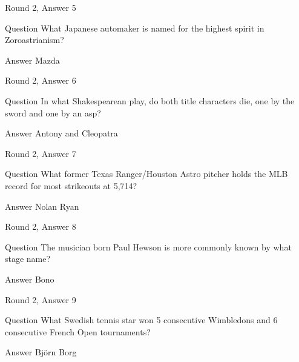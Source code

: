\documentclass[11pt]{beamer}
\begin{document}
\begin{frame}[t]{Round 2, Answer 5}
\vspace{2em}
\begin{block}{Question}
What Japanese automaker is named for the highest spirit in Zoroastrianism\@?
\end{block}
\pause{}
\begin{block}{Answer}
Mazda
\end{block}
\end{frame}
    

\begin{frame}[t]{Round 2, Answer 6}
\vspace{2em}
\begin{block}{Question}
In what Shakespearean play, do both title characters die, one by the sword and one by an asp\@?
\end{block}
\pause{}
\begin{block}{Answer}
Antony and Cleopatra
\end{block}
\end{frame}
    

\begin{frame}[t]{Round 2, Answer 7}
\vspace{2em}
\begin{block}{Question}
What former Texas Ranger/Houston Astro pitcher holds the MLB record for most strikeouts at 5,714\@?
\end{block}
\pause{}
\begin{block}{Answer}
Nolan Ryan
\end{block}
\end{frame}
    

\begin{frame}[t]{Round 2, Answer 8}
\vspace{2em}
\begin{block}{Question}
The musician born Paul Hewson is more commonly known by what stage name\@?
\end{block}
\pause{}
\begin{block}{Answer}
Bono
\end{block}
\end{frame}
    

\begin{frame}[t]{Round 2, Answer 9}
\vspace{2em}
\begin{block}{Question}
What Swedish tennis star won 5 consecutive Wimbledons and 6 consecutive French Open tournaments\@?
\end{block}
\pause{}
\begin{block}{Answer}
Björn Borg
\end{block}
\end{frame}
    
\end{document}
